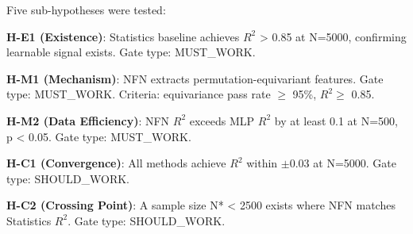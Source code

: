 
Five sub-hypotheses were tested:

\textbf{H-E1 (Existence)}: Statistics baseline achieves $R^2$ > 0.85 at N=5000, confirming learnable signal exists. Gate type: MUST\_WORK.

\textbf{H-M1 (Mechanism)}: NFN extracts permutation-equivariant features. Gate type: MUST\_WORK. Criteria: equivariance pass rate $\geq$ 95\%, $R^2 \geq$ 0.85.

\textbf{H-M2 (Data Efficiency)}: NFN $R^2$ exceeds MLP $R^2$ by at least 0.1 at N=500, p < 0.05. Gate type: MUST\_WORK.

\textbf{H-C1 (Convergence)}: All methods achieve $R^2$ within $\pm 0.03$ at N=5000. Gate type: SHOULD\_WORK.

\textbf{H-C2 (Crossing Point)}: A sample size N* < 2500 exists where NFN matches Statistics $R^2$. Gate type: SHOULD\_WORK.
